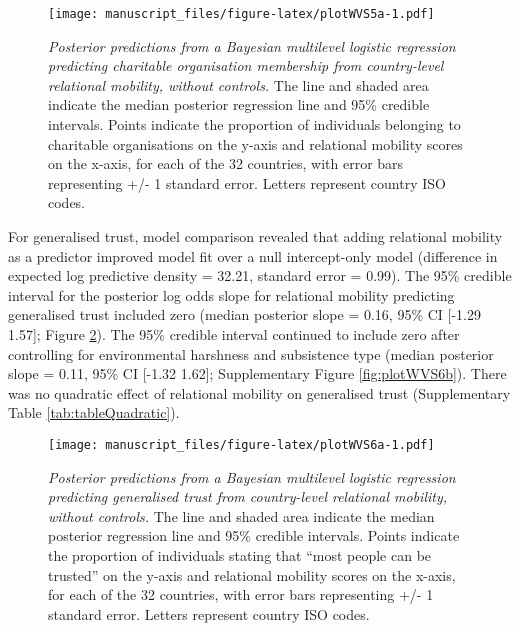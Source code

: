 \documentclass[
  man,floatsintext]{apa6}
\begin{document}
\begin{figure}
\centering
\texttt{[image: manuscript\_files/figure-latex/plotWVS5a-1.pdf]}
\caption{\label{fig:plotWVS5a}\emph{Posterior predictions from a Bayesian multilevel logistic regression predicting charitable organisation membership from country-level relational mobility, without controls.} The line and shaded area indicate the median posterior regression line and 95\% credible intervals. Points indicate the proportion of individuals belonging to charitable organisations on the y-axis and relational mobility scores on the x-axis, for each of the 32 countries, with error bars representing +/- 1 standard error. Letters represent country ISO codes.}
\end{figure}

For generalised trust, model comparison revealed that adding relational mobility as a predictor improved model fit over a null intercept-only model (difference in expected log predictive density = 32.21, standard error = 0.99). The 95\% credible interval for the posterior log odds slope for relational mobility predicting generalised trust included zero (median posterior slope = 0.16, 95\% CI {[}-1.29 1.57{]}; Figure \ref{fig:plotWVS6a}). The 95\% credible interval continued to include zero after controlling for environmental harshness and subsistence type (median posterior slope = 0.11, 95\% CI {[}-1.32 1.62{]}; Supplementary Figure \ref{fig:plotWVS6b}). There was no quadratic effect of relational mobility on generalised trust (Supplementary Table \ref{tab:tableQuadratic}).



\begin{figure}
\centering
\texttt{[image: manuscript\_files/figure-latex/plotWVS6a-1.pdf]}
\caption{\label{fig:plotWVS6a}\emph{Posterior predictions from a Bayesian multilevel logistic regression predicting generalised trust from country-level relational mobility, without controls.} The line and shaded area indicate the median posterior regression line and 95\% credible intervals. Points indicate the proportion of individuals stating that ``most people can be trusted'' on the y-axis and relational mobility scores on the x-axis, for each of the 32 countries, with error bars representing +/- 1 standard error. Letters represent country ISO codes.}
\end{figure}
\end{document}
